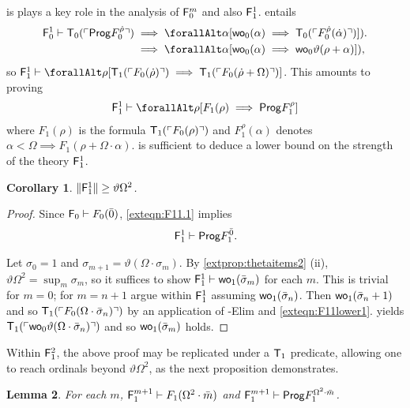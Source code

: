 \documentclass[UKenglish,cleveref,DIV=12]{scrartcl}
\let\forall\forallAlt
\newtheorem{lemma}{Lemma}
\newtheorem{corollary}[lemma]{Corollary}
\theoremstyle{definition}
\theoremstyle{definition}
\begin{document}
 is plays a key role in the analysis of $\mathsf{F}_0^m$ and also $\mathsf{F}_1^1$.  entails
\begin{align*}
 \F_0^1\proves\T_0(\gn{\Prog  F_0^{\dot\rho}})
	&\implies {\forall\alpha[\wo_0(\alpha)\implies \T_0(\gn{F_0^{\dot\rho}(\dot\alpha)})]}).\\
	&\implies {\forall\alpha[\wo_0(\alpha)\implies \wo_0\vartheta(\rho+\alpha)]}),
\end{align*}
so $\F_1^1\proves \forall\rho[\T_1(\gn{F_0(\dot\rho)})\implies \T_1(\gn{F_0(\dot\rho+\Omega)})]$. This amounts to proving
\begin{align}\label{exteqn:F11.1}
  \F_1^1\proves \forall\rho[{F_1(\rho)}\implies \Prog  F_1^\rho]
\end{align}
where $F_1(\rho)$ is the formula $\mathsf{T}_1(\ulcorner{F_0(\rho)}\urcorner)$ and
$F_1^\rho(\alpha)$ denotes $\alpha<\Omega\implies F_1(\rho+\Omega\cdot\alpha)$.
 is sufficient to deduce a lower bound on the strength of the
theory $\mathsf{F}_1^1$.
\begin{corollary}\label{extcor:F11lowerbound}
  $\lVert{\mathsf{F}_1^1}\rVert\ge\vartheta\Omega^2$.
\end{corollary}
\begin{proof}
Since $\mathsf{F}_0\vdash F_0(\bar0)$, \cref{exteqn:F11.1} implies
\begin{gather}\label{exteqn:F11lower1}
 \mathsf{F}_1^1\vdash \mathsf{Prog}  F^{\bar 0}_1.
\end{gather}

Let $\sigma_0=1$ and $\sigma_{m+1}=\vartheta(\Omega\cdot\sigma_m)$. By
\cref{extprop:thetaitems2} (ii), $\vartheta\Omega^2=\sup_m\sigma_m$, so it
suffices to show $\mathsf{F}_1^1\vdash\mathsf{wo}_1(\bar\sigma_m)$ for each $m$. This is
trivial for $m=0$; for $m=n+1$ argue within $\mathsf{F}_1^1$ assuming
$\mathsf{wo}_1(\bar\sigma_n)$. Then $\mathsf{wo}_1(\bar\sigma_n+1)$ and so $\mathsf{T}_1(\ulcorner{F_0(\Omega\cdot\bar\sigma_n)}\urcorner)$
by an application of -Elim and \cref{exteqn:F11lower1}.  yields $\mathsf{T}_1(\ulcorner{\mathsf{wo}_0\vartheta(\Omega\cdot\bar\sigma_n)}\urcorner)$ and so $\mathsf{wo}_1(\bar\sigma_m)$
holds.
\end{proof}
Within $\mathsf{F}_1^2$, the above proof may be replicated under a $\mathsf{T}_1$ predicate,
allowing one to reach ordinals beyond $\vartheta\Omega^2$, as the next
proposition demonstrates.
\begin{lemma}\label{extprop:F1wellordering}
For each $m$, $\mathsf{F}_1^{m+1}\vdash F_1(\Omega^2\cdot\bar m)$ and $\mathsf{F}_1^{m+1}\vdash \mathsf{Prog}  F_1^{\Omega^2\cdot\bar m}$.
\end{lemma}
\end{document}
